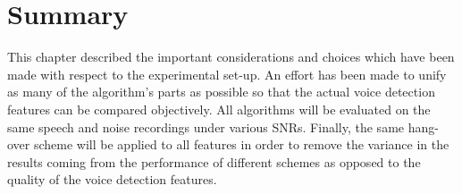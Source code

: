 \section{Summary}

This chapter described the important considerations and choices which have been made with respect to the experimental set-up. An effort has been made to unify as many of the algorithm's parts as possible so that the actual voice detection features can be compared objectively. All algorithms will be evaluated on the same speech and noise recordings under various SNRs. Finally, the same hang-over scheme will be applied to all features in order to remove the variance in the results coming from the performance of different schemes as opposed to the quality of the voice detection features.